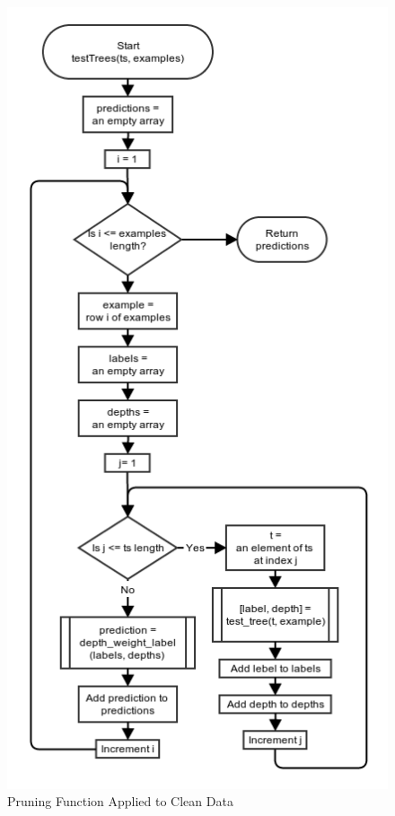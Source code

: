 \documentclass[11pt,a4paper]{article}
\begin{document}
\begin{figure}[p]
		\includegraphics[width=\textwidth, height=\textheight]{images/flow_chart/testtrees.png}
     	\caption{Pruning Function Applied to Clean Data}
     	\label{fig:pruningClean}
\end{figure}
\end{document}
